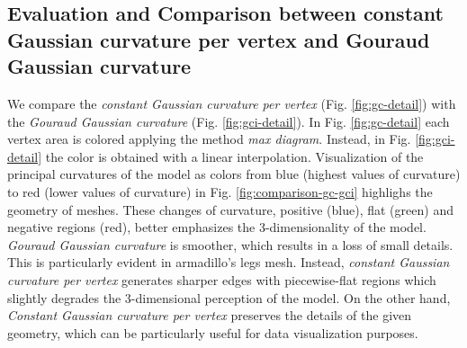 \subsection{Evaluation and Comparison between constant Gaussian curvature per vertex and Gouraud Gaussian curvature}
We compare the \textit{constant Gaussian curvature per vertex} (Fig. \ref{fig:gc-detail}) with the \textit{Gouraud Gaussian curvature} (Fig. \ref{fig:gci-detail}).
In Fig. \ref{fig:gc-detail} each vertex area is colored applying the method \textit{max diagram}. Instead, in Fig. \ref{fig:gci-detail} the color is obtained with a linear interpolation.
Visualization of the principal curvatures of the model as colors from blue (highest values of curvature) to red (lower values of curvature) in Fig. \ref{fig:comparison-gc-gci} highlighs the geometry of meshes.
These changes of curvature, positive (blue), flat (green) and negative regions (red), better emphasizes the 3-dimensionality of the model.
\textit{Gouraud Gaussian curvature} is smoother, which results in a loss of small details. This is particularly evident in armadillo's legs mesh. Instead, \textit{constant Gaussian curvature per vertex} generates sharper edges with piecewise-flat regions which slightly degrades the 3-dimensional perception of the model.
On the other hand, \textit{Constant Gaussian curvature per vertex} preserves the details of the given geometry, which can be particularly useful for data visualization purposes.

